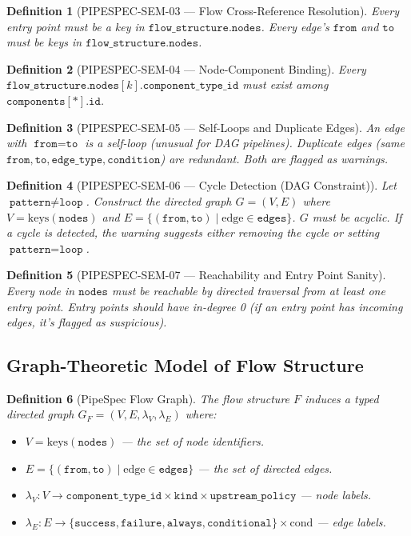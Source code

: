 \documentclass[11pt,a4paper]{article}
\newtheorem{definition}{Definition}[section]
\theoremstyle{definition}
\begin{document}
\begin{definition}[PIPESPEC-SEM-03 — Flow Cross-Reference Resolution]
Every entry point must be a key in $\texttt{flow\_structure.nodes}$. Every edge's $\texttt{from}$ and $\texttt{to}$ must be keys in $\texttt{flow\_structure.nodes}$.
\end{definition}

\begin{definition}[PIPESPEC-SEM-04 — Node-Component Binding]
Every $\texttt{flow\_structure.nodes}[k].\texttt{component\_type\_id}$ must exist among $\texttt{components}[*].\texttt{id}$.
\end{definition}

\begin{definition}[PIPESPEC-SEM-05 — Self-Loops and Duplicate Edges]
An edge with $\texttt{from} = \texttt{to}$ is a self-loop (unusual for DAG pipelines). Duplicate edges (same $\texttt{from}, \texttt{to}, \texttt{edge\_type}, \texttt{condition}$) are redundant. Both are flagged as warnings.
\end{definition}

\begin{definition}[PIPESPEC-SEM-06 — Cycle Detection (DAG Constraint)]
Let $\texttt{pattern} \neq \texttt{loop}$. Construct the directed graph $G = (V, E)$ where $V = \text{keys}(\texttt{nodes})$ and $E = \{(\texttt{from}, \texttt{to}) \mid \text{edge} \in \texttt{edges}\}$. $G$ must be acyclic. If a cycle is detected, the warning suggests either removing the cycle or setting $\texttt{pattern} = \texttt{loop}$.
\end{definition}

\begin{definition}[PIPESPEC-SEM-07 — Reachability and Entry Point Sanity]
Every node in $\texttt{nodes}$ must be reachable by directed traversal from at least one entry point. Entry points should have in-degree 0 (if an entry point has incoming edges, it's flagged as suspicious).
\end{definition}

\subsection{Graph-Theoretic Model of Flow Structure}
\begin{definition}[PipeSpec Flow Graph]
The flow structure $F$ induces a typed directed graph $G_F = (V, E, \lambda_V, \lambda_E)$ where:
\begin{itemize}[leftmargin=*]
    \item $V = \text{keys}(\texttt{nodes})$ — the set of node identifiers.
    \item $E = \{(\texttt{from}, \texttt{to}) \mid \text{edge} \in \texttt{edges}\}$ — the set of directed edges.
    \item $\lambda_V : V \to \texttt{component\_type\_id} \times \texttt{kind} \times \texttt{upstream\_policy}$ — node labels.
    \item $\lambda_E : E \to \{\texttt{success}, \texttt{failure}, \texttt{always}, \texttt{conditional}\} \times \text{cond}$ — edge labels.
\end{itemize}
\end{definition}
\end{document}
